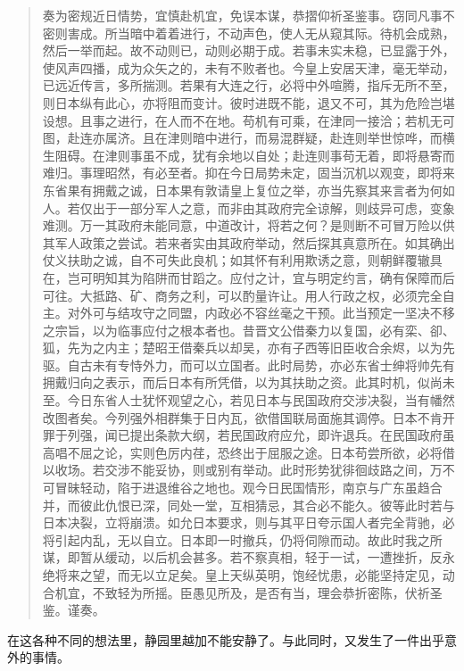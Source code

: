 \begin{quote}
	奏为密规近日情势，宜慎赴机宜，免误本谋，恭摺仰祈圣鉴事。窃同凡事不密则害成。所当暗中着着进行，不动声色，使人无从窥其际。待机会成熟，然后一举而起。故不动则已，动则必期于成。若事未实未稳，已显露于外，使风声四播，成为众矢之的，未有不败者也。今皇上安居天津，毫无举动，已远近传言，多所揣测。若果有大连之行，必将中外喧腾，指斥无所不至，则日本纵有此心，亦将阻而变计。彼时进既不能，退又不可，其为危险岂堪设想。且事之进行，在人而不在地。苟机有可乘，在津同一接洽；若机无可图，赴连亦属济。且在津则暗中进行，而易混群疑，赴连则举世惊哗，而横生阻碍。在津则事虽不成，犹有余地以自处；赴连则事苟无着，即将悬寄而难归。事理昭然，有必至者。抑在今日局势未定，固当沉机以观变，即将来东省果有拥戴之诚，日本果有敦请皇上复位之举，亦当先察其来言者为何如人。若仅出于一部分军人之意，而非由其政府完全谅解，则歧异可虑，变象难测。万一其政府未能同意，中道改计，将若之何？是则断不可冒万险以供其军人政策之尝试。若来者实由其政府举动，然后探其真意所在。如其确出仗义扶助之诚，自不可失此良机；如其怀有利用欺诱之意，则朝鲜覆辙具在，岂可明知其为陷阱而甘蹈之。应付之计，宜与明定约言，确有保障而后可往。大抵路、矿、商务之利，可以酌量许让。用人行政之权，必须完全自主。对外可与结攻守之同盟，内政必不容丝毫之干预。此当预定一坚决不移之宗旨，以为临事应付之根本者也。昔晋文公借秦力以复国，必有栾、卻、狐，先为之内主；楚昭王借秦兵以却吴，亦有子西等旧臣收合余烬，以为先驱。自古未有专恃外力，而可以立国者。此时局势，亦必东省士绅将帅先有拥戴归向之表示，而后日本有所凭借，以为其扶助之资。此其时机，似尚未至。今日东省人士犹怀观望之心，若见日本与民国政府交涉决裂，当有幡然改图者矣。今列强外相群集于日内瓦，欲借国联局面施其调停。日本不肯开罪于列强，闻已提出条款大纲，若民国政府应允，即许退兵。在民国政府虽高唱不屈之论，实则色厉内荏，恐终出于屈服之途。日本苟尝所欲，必将借以收场。若交涉不能妥协，则或别有举动。此时形势犹徘徊歧路之间，万不可冒昧轻动，陷于进退维谷之地也。观今日民国情形，南京与广东虽趋合并，而彼此仇恨已深，同处一堂，互相猜忌，其合必不能久。彼等此时若与日本决裂，立将崩溃。如允日本要求，则与其平日夸示国人者完全背驰，必将引起内乱，无以自立。日本即一时撤兵，仍将伺隙而动。故此时我之所谋，即暂从缓动，以后机会甚多。若不察真相，轻于一试，一遭挫折，反永绝将来之望，而无以立足矣。皇上天纵英明，饱经忧患，必能坚持定见，动合机宜，不致轻为所摇。臣愚见所及，是否有当，理会恭折密陈，伏祈圣鉴。谨奏。\\
\end{quote}

在这各种不同的想法里，静园里越加不能安静了。与此同时，又发生了一件出乎意外的事情。
